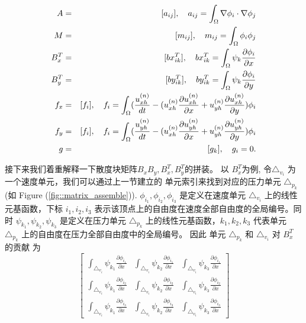    \begin{eqnarray}
     A & = & [a_{ij}], \quad a_{ij} = \int_\Omega \nabla \phi_i \cdot \nabla
     \phi_j  \notag \\
     M & = & [m_{ij}], \quad m_{ij} = \int_{\Omega}\phi_i \phi_j \notag \\
     B_x^T & = & [bx^T_{ik}], \quad bx^T_{ik} = \int_{\Omega} \psi_k
     \frac{\partial{\phi_i}}{\partial x}  \notag \\
     B_y^T & = & [by^T_{ik}], \quad by^T_{ik} = \int_{\Omega} \psi_k
     \frac{\partial {\phi_i}}{\partial y}  \notag \\
     f_x & = & [f_i], \quad f_i = \int_\Omega (\frac{u_{xh}^{(n)}}{dt} - (u_{xh}^{(n)}
     \frac{\partial u_{xh}^{(n)}}{\partial x} + u_{yh}^{(n)} \frac{\partial
       u_{xh}^{(n)}}{\partial y}) \phi_i \notag \\
     f_y & = & [f_i], \quad f_i = \int_\Omega (\frac{u_{yh}^{(n)}}{dt} - (u_{xh}^{(n)}
     \frac{\partial u_{yh}^{(n)}}{\partial x} + u_{yh}^{(n)} \frac{\partial
       u_{yh}^{(n)}}{\partial y}) \phi_i \notag \\
     g & = &  [g_k],\quad  g_i = 0. \notag
   \end{eqnarray}

   接下来我们着重解释一下散度块矩阵$B_x B_y, B_x^T, B_y^T$的拼装。 以
   $B_x^T$为例, 令$\triangle_{v_i}$ 为一个速度单元，我们可以通过上一节建立的
   单元索引来找到对应的压力单元 $\triangle_{p_k}$(如 Figure
   (\ref{fig::matrix_assemble})). $\phi_{i_1}, \phi_{i_2}, \phi_{i_3}$
   是定义在速度单元 $\triangle_{v_i}$ 上的线性元基函数，下标 $i_1,
   i_2, i_3$ 表示该顶点上的自由度在速度全部自由度的全局编号。同时
   $\psi_{k_1}, \psi_{k_2}, \psi_{k_3}$ 是定义在压力单元
   $\triangle_{p_k}$ 上的线性元基函数，$k_1, k_2, k_3$ 代表单元
   $\triangle_{p_k}$ 上的自由度在压力全部自由度中的全局编号。
   因此 单元 $\triangle_{p_k}$ 和 $\triangle_{v_i}$ 对 $B_x^T$ 的贡献
   为
   \begin{equation}
     \left[
     \begin{array}{lll}
       \int_{\triangle_{v_i}}\psi_{k_1} \frac{\partial
         \phi_{i_1}}{\partial x} & \int_{\triangle_{v_i}} \psi_{k_2}
       \frac{\partial \phi_{i_1}}{\partial x} & \int_{\triangle_{v_i}}
       \psi_{k_3} \frac{\partial \phi_{i_1}}{\partial x} \\
       \int_{\triangle_{v_i}} \psi_{k_1} \frac{\partial
         \phi_{i_2}}{\partial x} & \int_{\triangle_{v_i}} \psi_{k_2}
       \frac{\partial \phi_{i_2}}{\partial x} & \int_{\triangle_{v_i}}
       \psi_{k_3} \frac{\partial \phi_{i_2}}{\partial x} \\
       \int_{\triangle_{v_i}} \psi_{k_1} \frac{\partial
         \phi_{i_3}}{\partial x} & \int_{\triangle_{v_i}} \psi_{k_2}
       \frac{\partial \phi_{i_3}}{\partial x} & \int_{\triangle_{v_i}}
       \psi_{k_3} \frac{\partial \phi_{i_3}}{\partial x}
     \end{array}
   \right]
   \label{eq::element_matrix}
   \end{equation}

